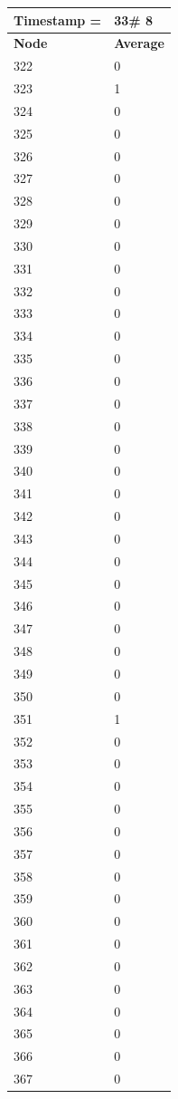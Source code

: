 \begin{tabular}{|l||l|}
\hline
\textbf{Timestamp =} & \textbf{33}\# 8\\\hline
	\textbf{Node} & \textbf{Average} \\ \hline
\hline
	322 & 0 \\ \hline
	323 & 1 \\ \hline
	324 & 0 \\ \hline
	325 & 0 \\ \hline
	326 & 0 \\ \hline
	327 & 0 \\ \hline
	328 & 0 \\ \hline
	329 & 0 \\ \hline
	330 & 0 \\ \hline
	331 & 0 \\ \hline
	332 & 0 \\ \hline
	333 & 0 \\ \hline
	334 & 0 \\ \hline
	335 & 0 \\ \hline
	336 & 0 \\ \hline
	337 & 0 \\ \hline
	338 & 0 \\ \hline
	339 & 0 \\ \hline
	340 & 0 \\ \hline
	341 & 0 \\ \hline
	342 & 0 \\ \hline
	343 & 0 \\ \hline
	344 & 0 \\ \hline
	345 & 0 \\ \hline
	346 & 0 \\ \hline
	347 & 0 \\ \hline
	348 & 0 \\ \hline
	349 & 0 \\ \hline
	350 & 0 \\ \hline
	351 & 1 \\ \hline
	352 & 0 \\ \hline
	353 & 0 \\ \hline
	354 & 0 \\ \hline
	355 & 0 \\ \hline
	356 & 0 \\ \hline
	357 & 0 \\ \hline
	358 & 0 \\ \hline
	359 & 0 \\ \hline
	360 & 0 \\ \hline
	361 & 0 \\ \hline
	362 & 0 \\ \hline
	363 & 0 \\ \hline
	364 & 0 \\ \hline
	365 & 0 \\ \hline
	366 & 0 \\ \hline
	367 & 0 \\ \hline
\end{tabular}
